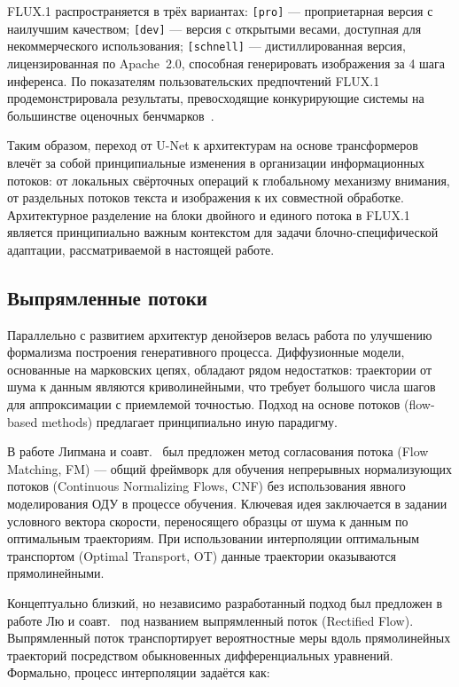FLUX.1 распространяется в трёх вариантах: \texttt{[pro]} --- проприетарная версия с наилучшим качеством; \texttt{[dev]} --- версия с открытыми весами, доступная для некоммерческого использования; \texttt{[schnell]} --- дистиллированная версия, лицензированная по Apache~2.0, способная генерировать изображения за 4 шага инференса. По показателям пользовательских предпочтений FLUX.1 продемонстрировала результаты, превосходящие конкурирующие системы на большинстве оценочных бенчмарков~\cite{blackforest2024flux}.

Таким образом, переход от U-Net к архитектурам на основе трансформеров влечёт за собой принципиальные изменения в организации информационных потоков: от локальных свёрточных операций к глобальному механизму внимания, от раздельных потоков текста и изображения к их совместной обработке. Архитектурное разделение на блоки двойного и единого потока в FLUX.1 является принципиально важным контекстом для задачи блочно-специфической адаптации, рассматриваемой в настоящей работе.


\subsection{Выпрямленные потоки}

Параллельно с развитием архитектур денойзеров велась работа по улучшению формализма построения генеративного процесса. Диффузионные модели, основанные на марковских цепях, обладают рядом недостатков: траектории от шума к данным являются криволинейными, что требует большого числа шагов для аппроксимации с приемлемой точностью. Подход на основе потоков (flow-based methods) предлагает принципиально иную парадигму.

В работе Липмана и соавт.~\cite{lipman2023flow} был предложен метод согласования потока (Flow Matching, FM) --- общий фреймворк для обучения непрерывных нормализующих потоков (Continuous Normalizing Flows, CNF) без использования явного моделирования ОДУ в процессе обучения. Ключевая идея заключается в задании условного вектора скорости, переносящего образцы от шума к данным по оптимальным траекториям. При использовании интерполяции оптимальным транспортом (Optimal Transport, OT) данные траектории оказываются прямолинейными.

Концептуально близкий, но независимо разработанный подход был предложен в работе Лю и соавт.~\cite{liu2022rectifiedflow} под названием выпрямленный поток (Rectified Flow). Выпрямленный поток транспортирует вероятностные меры вдоль прямолинейных траекторий посредством обыкновенных дифференциальных уравнений. Формально, процесс интерполяции задаётся как:

